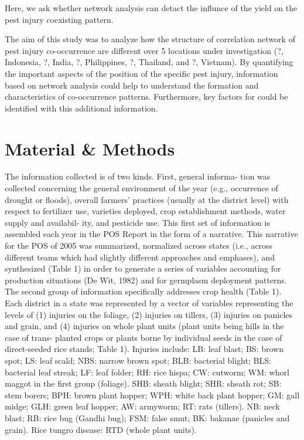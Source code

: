 \documentclass{frontiersSCNS} %
\begin{document}
Here, we ask whether network analysis can detact the influnce of the yield on the pest injury coexisting pattern.

The aim of this study was to analyze how the structure of correlation network of pest injury co-occurrence are different over 5 locations under investigation (?, Indonesia, ?, India, ?, Philippines, ?, Thailand, and ?, Vietnam). By quantifying the important aspects of the position of the specific pest injury, information based on network analysis could help to understand the formation and characteristics of co-occurrence patterns. Furthermore, key factors for could be identified with this additional information.
                                                                                                                                                                                                                                                                                                 

\section{Material \& Methods}

The information collected is of two kinds. First, general informa- tion was collected concerning the general environment of the year (e.g., occurrence of drought or floods), overall farmers’ practices (usually at the district level) with respect to fertilizer use, varieties deployed, crop establishment methods, water supply and availabil- ity, and pesticide use. This first set of information is assembled each year in the POS Report in the form of a narrative. This narrative for the POS of 2005 was summarized, normalized across states (i.e., across different teams which had slightly different approaches and emphases), and synthesized (Table 1) in order to generate a series of variables accounting for production situations (De Wit, 1982) and for germplasm deployment patterns.
The second group of information specifically addresses crop health (Table 1). Each district in a state was represented by a vector of variables representing the levels of (1) injuries on the foliage, (2) injuries on tillers, (3) injuries on panicles and grain, and (4) injuries on whole plant units (plant units being hills in the case of trans- planted crops or plants borne by individual seeds in the case of direct-seeded rice stands; Table 1). Injuries include:
LB: leaf blast; BS: brown spot; LS: leaf scald; NBS: narrow brown spot; BLB: bacterial blight; BLS: bacterial leaf streak; LF: leaf
folder; RH: rice hispa; CW: cutworm; WM: whorl maggot in the
first group (foliage).
 SHB: sheath blight; SHR: sheath rot; SB: stem borers; BPH: brown
plant hopper; WPH: white back plant hopper; GM: gall midge;
GLH: green leaf hopper; AW: armyworm; RT: rats (tillers).
NB: neck blast; RB: rice bug (Gandhi bug); FSM: false smut; BK:
bakanae (panicles and grain).
Rice tungro disease: RTD (whole plant units).
\end{document}
